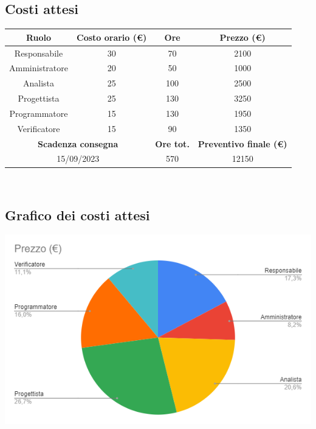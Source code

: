 \documentclass[a4paper, 12pt]{article}
\begin{document}
\subsection{Costi attesi}

\begin{tabular}{|c|c|c|c|}
    \hline
    \textbf{Ruolo} & \textbf{Costo orario (\euro)} & \textbf{Ore} & \textbf{Prezzo (\euro)}\\
    \hline
    Responsabile & 30 & 70 & 2100\\
    \hline
    Amministratore & 20 & 50 & 1000\\
    \hline
    Analista & 25 & 100 & 2500\\
    \hline
    Progettista & 25 & 130 & 3250\\
    \hline
    Programmatore & 15 & 130 & 1950\\
    \hline
    Verificatore & 15 & 90 & 1350\\
    \hline\hline
    \multicolumn{2}{|c|}{\textbf{Scadenza consegna}} & \textbf{Ore tot.} & \textbf{Preventivo finale (\euro)}\\
    \hline
    \multicolumn{2}{|c|}{15/09/2023} & 570 & 12150\\
    \hline
\end{tabular}\\[8pt]

\subsection{Grafico dei costi attesi}
\includegraphics{grafico_costi.png}
\end{document}
